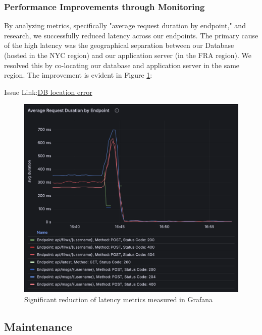 \subsubsection{Performance Improvements through Monitoring}
By analyzing metrics, specifically "average request duration by endpoint," and research, we successfully reduced latency across our endpoints. The primary cause of the high latency was the geographical separation between our Database (hosted in the NYC region) and our application server (in the FRA region). We resolved this by co-locating our database and application server in the same region. The improvement is evident in Figure \ref{fig:grafana-endpoints-latency}:

Issue Link:\href{https://github.com/DevopsGroupC/Minitwit/wiki/Week-07}{\color{blue}DB location error}

\begin{figure}[H]
\centering
\includegraphics[height=0.9\textwidth]{images/grafana-endpoints-latency.png}
\caption{Significant reduction of latency metrics measured in Grafana}
\label{fig:grafana-endpoints-latency}
\end{figure}

\subsection{Maintenance}
